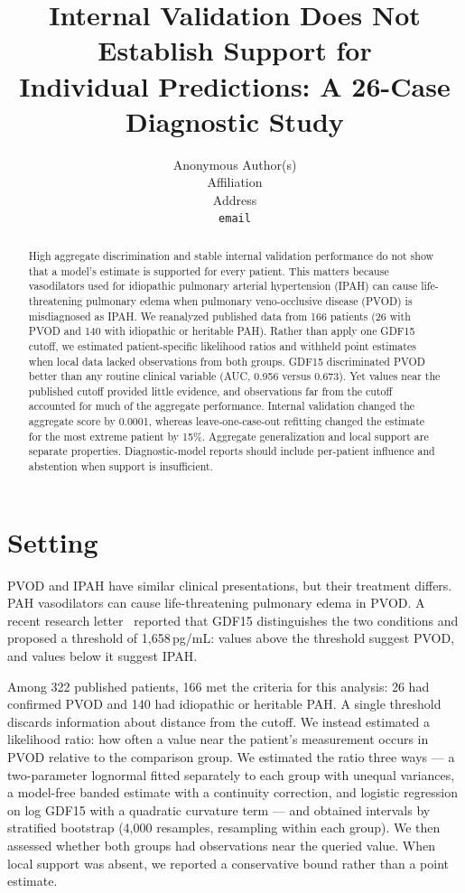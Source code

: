 \documentclass{article}
\title{Internal Validation Does Not Establish Support for\\
Individual Predictions: A 26-Case Diagnostic Study}
\author{%
  Anonymous Author(s) \\
  Affiliation \\
  Address \\
  \texttt{email} \\
}
\begin{document}
\maketitle

\begin{abstract}
High aggregate discrimination and stable internal validation performance do not show
that a model's estimate is supported for every patient. This matters because
vasodilators used for idiopathic pulmonary arterial hypertension (IPAH) can cause
life-threatening pulmonary edema when pulmonary veno-occlusive disease (PVOD) is
misdiagnosed as IPAH. We reanalyzed published data from 166 patients (26 with PVOD and
140 with idiopathic or heritable PAH). Rather than apply one GDF15 cutoff, we estimated
patient-specific likelihood ratios and withheld point estimates when local data lacked
observations from both groups. GDF15 discriminated PVOD better than any routine clinical
variable (AUC, 0.956 versus 0.673). Yet values near the published cutoff provided little
evidence, and observations far from the cutoff accounted for much of the aggregate
performance. Internal validation changed the aggregate score by 0.0001, whereas
leave-one-case-out refitting changed the estimate for the most extreme patient by 15\%.
Aggregate generalization and local support are separate properties. Diagnostic-model
reports should include per-patient influence and abstention when support is
insufficient.
\end{abstract}

\section{Setting}

PVOD and IPAH have similar clinical presentations, but their treatment differs. PAH
vasodilators can cause life-threatening pulmonary edema in PVOD. A recent research
letter~\cite{source} reported that GDF15 distinguishes the two conditions and proposed a
threshold of 1{,}658\,pg/mL: values above the threshold suggest PVOD, and values below it
suggest IPAH.

Among 322 published patients, 166 met the criteria for this analysis: 26 had confirmed
PVOD and 140 had idiopathic or heritable PAH. A single threshold discards information
about distance from the cutoff. We instead estimated a likelihood ratio: how often a
value near the patient's measurement occurs in PVOD relative to the comparison group. We
estimated the ratio three ways --- a two-parameter lognormal fitted separately to each
group with unequal variances, a model-free banded estimate with a continuity correction,
and logistic regression on log GDF15 with a quadratic curvature term --- and obtained
intervals by stratified bootstrap (4{,}000 resamples, resampling within each group). We
then assessed whether both groups had observations near the queried value. When local
support was absent, we reported a conservative bound rather than a point estimate.
\end{document}
